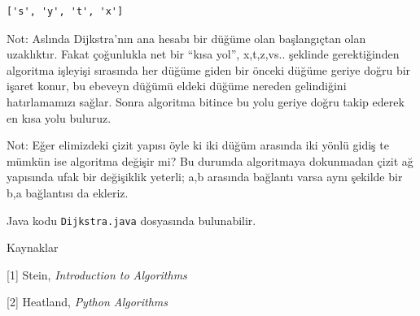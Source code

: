 \documentclass[12pt,fleqn]{article}\usepackage{../../common}
\begin{document}
\begin{verbatim}
['s', 'y', 't', 'x']
\end{verbatim}

Not: Aslında Dijkstra'nın ana hesabı bir düğüme olan başlangıçtan olan
uzaklıktır. Fakat çoğunlukla net bir ``kısa yol'', x,t,z,vs.. şeklinde
gerektiğinden algoritma işleyişi sırasında her düğüme giden bir önceki
düğüme geriye doğru bir işaret konur, bu ebeveyn düğümü eldeki düğüme
nereden gelindiğini hatırlamamızı sağlar. Sonra algoritma bitince bu yolu
geriye doğru takip ederek en kısa yolu buluruz.

Not: Eğer elimizdeki çizit yapısı öyle ki iki düğüm arasında iki yönlü
gidiş te mümkün ise algoritma değişir mi? Bu durumda algoritmaya dokunmadan
çizit ağ yapısında ufak bir değişiklik yeterli; a,b arasında bağlantı varsa
aynı şekilde bir b,a bağlantısı da ekleriz. 

Java kodu \verb!Dijkstra.java! dosyasında bulunabilir.

Kaynaklar

[1] Stein, {\em Introduction to Algorithms}

[2] Heatland, {\em Python Algorithms}
\end{document}
